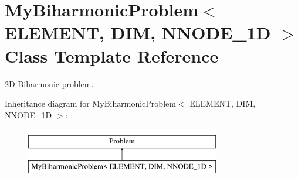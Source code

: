 \hypertarget{classMyBiharmonicProblem}{}\section{My\+Biharmonic\+Problem$<$ E\+L\+E\+M\+E\+NT, D\+IM, N\+N\+O\+D\+E\+\_\+1D $>$ Class Template Reference}
\label{classMyBiharmonicProblem}


2D Biharmonic problem.  


Inheritance diagram for My\+Biharmonic\+Problem$<$ E\+L\+E\+M\+E\+NT, D\+IM, N\+N\+O\+D\+E\+\_\+1D $>$\+:\begin{figure}[H]
\begin{center}
\leavevmode
\includegraphics[height=2.000000cm]{classMyBiharmonicProblem}
\end{center}
\end{figure}
